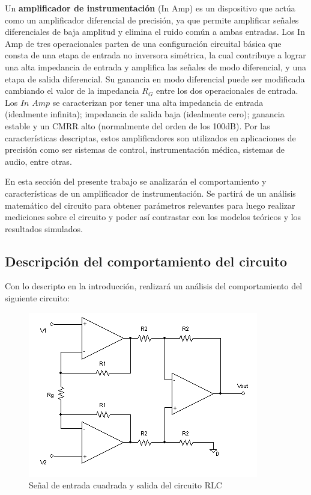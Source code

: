 Un \textbf{amplificador de instrumentación} (In Amp) es un dispositivo que actúa como un amplificador diferencial de precisión, ya que permite amplificar señales diferenciales de baja amplitud y elimina el ruido común a ambas entradas. Los In Amp de tres operacionales parten de una configuración circuital básica que consta de una etapa de entrada no inversora simétrica, la cual contribuye a lograr una alta impedancia de entrada y amplifica las señales de modo diferencial, y una etapa de salida diferencial. Su ganancia en modo diferencial puede ser modificada cambiando el valor de la impedancia $R_G$ entre los dos operacionales de entrada. Los $In$ $Amp$ se caracterizan por tener una alta impedancia de entrada (idealmente infinita); impedancia de salida baja (idealmente cero); ganancia estable y un CMRR alto (normalmente del orden de los 100dB). Por las características descriptas, estos amplificadores son utilizados en aplicaciones de precisión como ser sistemas de control, instrumentación médica, sistemas de audio, entre otras. 

En esta sección del presente trabajo se analizarán el comportamiento y características de un amplificador de instrumentación. Se partirá de un análisis matemático del circuito para obtener parámetros relevantes para luego realizar mediciones sobre el circuito y poder así contrastar con los modelos teóricos y los resultados simulados. 

\subsection{Descripción del comportamiento del circuito}

Con lo descripto en la introducción, realizará un análisis del comportamiento del siguiente circuito:

\begin{figure}[H]
    \centering
    \includegraphics[scale=0.8]{../Ejercicio3-AmplificadorDeInstrumentacion/Imagenes/InAmpWiki.png}
    \caption{Señal de entrada cuadrada y salida del circuito RLC}
    \label{fig:}
\end{figure}


